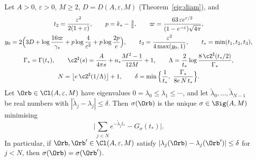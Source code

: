 \begin{theorem}\label{eig:E}
Let $A>0$, $\varepsilon>0$, $M\ge2$, $D=D(A,\varepsilon,M)$ (Theorem~\ref{eig:diam}), and
\begin{gather*}
  t_2=\frac{\varepsilon^2}{2(1+\varepsilon)},\qquad p=k_*-\tfrac32,\qquad \varpi=\frac{63\,\varepsilon e^{\varepsilon/2}}{(1-e^{-\varepsilon})\sqrt{4\pi}},\\
  y_0=2\Big(3D+\log\frac{16\varpi}{\gamma_*}+p\log\frac4{\varepsilon^2}+p\log\frac{2p}e\Big),\qquad t_3=\frac{\varepsilon^2}{4\max(y_0,1)},\qquad t_*=\min(t_1,t_2,t_3),\\
  \Gamma_*=\Gamma(t_*),\qquad \cZ^\sharp(s)=\frac A{4\pi s}+n_*\frac{M^2-1}{12M}+1,\qquad \Lambda=\frac2{t_*}\log\frac{8\,\cZ^\sharp(t_*/2)}{\Gamma_*},\\
  N=\big\lfloor e\,\cZ^\sharp(1/\Lambda)\big\rfloor+1,\qquad \delta=\min\Big\{\frac1{t_*},\ \frac{\Gamma_*}{8e\,N\,t_*}\Big\}.
\end{gather*}
Let $\Orb\in\Cl(A,\varepsilon,M)$ have eigenvalues $0=\lambda_0\le\lambda_1\le\cdots$, and let $\tilde\lambda_0,\dots,\tilde\lambda_{N-1}$ be real numbers with $|\tilde\lambda_j-\lambda_j|\le\delta$. Then $\sigma(\Orb)$ is the unique $\sigma\in\Sig(A,M)$ minimising
\[
  \Big|\sum_{j<N}e^{-\tilde\lambda_jt_*}-G_\sigma(t_*)\Big|.
\]
In particular, if $\Orb,\Orb'\in\Cl(A,\varepsilon,M)$ satisfy $|\lambda_j(\Orb)-\lambda_j(\Orb')|\le\delta$ for $j<N$, then $\sigma(\Orb)=\sigma(\Orb')$.
\end{theorem}

